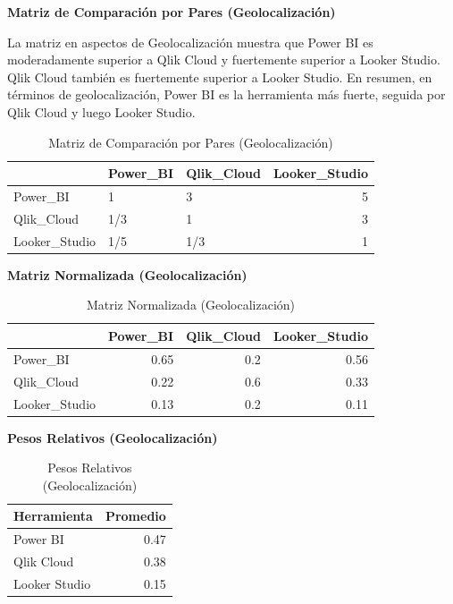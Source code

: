 \documentclass[
  11pt,
  bookmarksnumbered]{article}
\begin{document}
\textbf{Matriz de Comparación por Pares (Geolocalización)}

La matriz en aspectos de Geolocalización muestra que Power BI es moderadamente superior a Qlik Cloud y fuertemente superior a Looker Studio. Qlik Cloud también es fuertemente superior a Looker Studio. En resumen, en términos de geolocalización, Power BI es la herramienta más fuerte, seguida por Qlik Cloud y luego Looker Studio.

\begin{table}[H]

\caption{\label{tab:unnamed-chunk-39}Matriz de Comparación por Pares (Geolocalización)}
\centering
\fontsize{12}{14}\selectfont
\begin{tabular}[t]{l|l|l|r}
\hline
  & Power\_BI & Qlik\_Cloud & Looker\_Studio\\
\hline
Power\_BI & 1 & 3 & 5\\
\hline
Qlik\_Cloud & 1/3 & 1 & 3\\
\hline
Looker\_Studio & 1/5 & 1/3 & 1\\
\hline
\end{tabular}
\end{table}

\textbf{Matriz Normalizada (Geolocalización)}

\begin{table}[H]

\caption{\label{tab:unnamed-chunk-40}Matriz Normalizada (Geolocalización)}
\centering
\fontsize{12}{14}\selectfont
\begin{tabular}[t]{l|r|r|r}
\hline
  & Power\_BI & Qlik\_Cloud & Looker\_Studio\\
\hline
Power\_BI & 0.65 & 0.2 & 0.56\\
\hline
Qlik\_Cloud & 0.22 & 0.6 & 0.33\\
\hline
Looker\_Studio & 0.13 & 0.2 & 0.11\\
\hline
\end{tabular}
\end{table}

\newpage

\textbf{Pesos Relativos (Geolocalización)}

\begin{table}[H]

\caption{\label{tab:unnamed-chunk-41}Pesos Relativos (Geolocalización)}
\centering
\fontsize{12}{14}\selectfont
\begin{tabular}[t]{l|r}
\hline
Herramienta & Promedio\\
\hline
Power BI & 0.47\\
\hline
Qlik Cloud & 0.38\\
\hline
Looker Studio & 0.15\\
\hline
\end{tabular}
\end{table}
\end{document}
